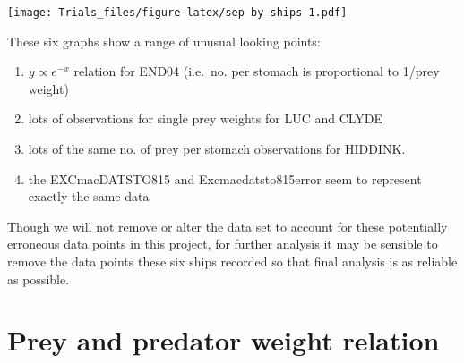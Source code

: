 \documentclass[
]{article}
\newenvironment{Shaded}{\begin{snugshade}}{\end{snugshade}}
\newcommand{\AttributeTok}[1]{\textcolor[rgb]{0.77,0.63,0.00}{#1}}
\newcommand{\DecValTok}[1]{\textcolor[rgb]{0.00,0.00,0.81}{#1}}
\newcommand{\FloatTok}[1]{\textcolor[rgb]{0.00,0.00,0.81}{#1}}
\newcommand{\FunctionTok}[1]{\textcolor[rgb]{0.00,0.00,0.00}{#1}}
\newcommand{\NormalTok}[1]{#1}
\newcommand{\SpecialCharTok}[1]{\textcolor[rgb]{0.00,0.00,0.00}{#1}}
\newcommand{\StringTok}[1]{\textcolor[rgb]{0.31,0.60,0.02}{#1}}
\providecommand{\tightlist}{%
  \setlength{\itemsep}{0pt}\setlength{\parskip}{0pt}}
\begin{document}
\begin{Shaded}
\end{Shaded}

\texttt{[image: Trials\_files/figure-latex/sep by ships-1.pdf]}

These six graphs show a range of unusual looking points:

\begin{enumerate}
\def\labelenumi{\arabic{enumi}.}
\tightlist
\item
  \(y \propto e^{-x}\) relation for END04 (i.e.~no. per stomach is
  proportional to 1/prey weight)
\item
  lots of observations for single prey weights for LUC and CLYDE
\item
  lots of the same no. of prey per stomach observations for HIDDINK.
\item
  the EXCmacDATSTO815 and Excmacdatsto815error seem to represent exactly
  the same data
\end{enumerate}

Though we will not remove or alter the data set to account for these
potentially erroneous data points in this project, for further analysis
it may be sensible to remove the data points these six ships recorded so
that final analysis is as reliable as possible.

\hypertarget{prey-and-predator-weight-relation}{%
\section{Prey and predator weight
relation}\label{prey-and-predator-weight-relation}}
\end{document}
